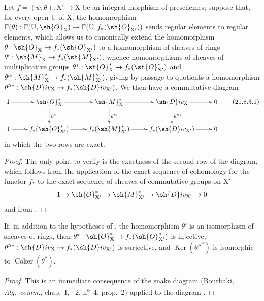 \begin{proposition}[21.8.3]
\label{IV.21.8.3}
Let $f=(\psi,\theta):\mathrm{X}'\to\mathrm{X}$ be an integral morphism of preschemes;
suppose that, for every open $\mathrm{U}$ of $\mathrm{X}$, the homomorphism $\Gamma(\theta):\Gamma(\mathrm{U},\sh{O}_\mathrm{X})\to\Gamma(\mathrm{U},f_*(\sh{O}_{\mathrm{X}'}))$ sends regular elements to regular elements, which allows us to canonically extend the homomorphism $\theta:\sh{O}_\mathrm{X}\to f_*(\sh{O}_{\mathrm{X}'})$ to a homomorphism of sheaves of rings $\theta':\sh{M}_\mathrm{X}\to f_*(\sh{M}_{\mathrm{X}'})$, whence homomorphisms of sheaves of multiplicative groups $\theta^*:\sh{O}^*_\mathrm{X}\to f_*(\sh{O}^*_{\mathrm{X}'})$ and $\theta'^*:\sh{M}^*_\mathrm{X}\to f_*(\sh{M}^*_{\mathrm{X}'})$, giving by passage to quotients a homomorphism $\theta''^*:\sh{D}iv_\mathrm{X}\to f_*(\sh{D}iv_{\mathrm{X}'})$.
We then have a commutative diagram
\[
\label{IV.21.8.3.1}
  \xymatrix{
    1 \ar[r] & \sh{O}^*_\mathrm{X} \ar[r] \ar[d]^{\theta^*} & \sh{M}^*_\mathrm{X} \ar[r] \ar[d]^{\theta'^*} & \sh{D}iv_\mathrm{X} \ar[r] \ar[d]^{\theta''^*} & 0\\
    1 \ar[r] & f_*(\sh{O}^*_{\mathrm{X}'}) \ar[r] & f_*(\sh{M}^*_{\mathrm{X}'}) \ar[r] & f_*(\sh{D}iv_{\mathrm{X}'}) \ar[r] & 0
  }
  \tag{21.8.3.1}
\]
in which the two rows are exact.
\end{proposition}

\begin{proof}
The only point to verify is the exactness of the second row of the diagram, which follows from the application of the exact sequence of cohomology for the functor $f_*$ to the exact sequence of sheaves of commutative groups on $\mathrm{X}'$
\[
  1\to\sh{O}^*_{\mathrm{X}'}\to\sh{M}^*_{\mathrm{X}'}\to\sh{D}iv_{\mathrm{X}'}\to 0
\]
and from .
\end{proof}

\begin{corollary}[21.8.4]
\label{IV.21.8.4}
If, in addition to the hypotheses of , the homomorphism $\theta'$ is an isomorphism of sheaves of rings, then $\theta^*:\sh{O}^*_\mathrm{X}\to f_*(\sh{O}^*_{\mathrm{X}'})$ is injective, $\theta''^*:\sh{D}iv_\mathrm{X}\to f_*(\sh{D}iv_{\mathrm{X}'})$ is surjective, and $\operatorname{Ker}(\theta''^*)$ is isomorphic to $\operatorname{Coker}(\theta^*)$.
\end{corollary}

\begin{proof}
This is an immediate consequence of the snake diagram (Bourbaki, \emph{Alg.\ comm.}, chap.~I, \textsection~2, n\textsuperscript{o}~4, prop.~2) applied to the diagram .
\end{proof}

